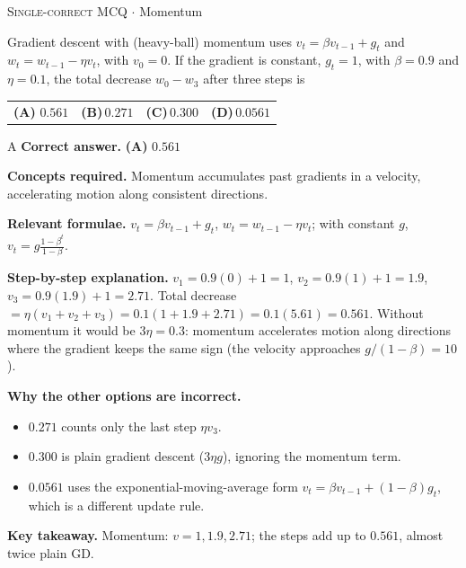\documentclass[11pt,a4paper]{article}
\newcommand{\optlabel}[1]{\textbf{(#1)}}
\newcommand{\correctlabel}[1]{\textcolor{okgreen}{\textbf{(#1)}\,\ding{51}}}
\newenvironment{qitem}[1]{\begin{list}{}{\setlength{\leftmargin}{3.3em}\setlength{\labelwidth}{3.1em}%
  \setlength{\labelsep}{0.2em}\setlength{\topsep}{3pt}\setlength{\parsep}{3pt}}\item[\textbf{Q.#1}\hfill]}{\end{list}}
\newcommand{\qsep}{\par\vspace{2pt}{\color{black!15}\hrule}\vspace{4pt}}
\newcommand{\qmeta}[2]{{\footnotesize\color{black!60}\textsc{#1} \;$\cdot$\; #2}\par}
\begin{document}
\begin{qitem}{14}
\qmeta{Single-correct MCQ}{Momentum}
Gradient descent with (heavy-ball) momentum uses $v_{t} = \beta v_{t-1} + g_t$ and $w_{t} = w_{t-1} - \eta v_t$,
with $v_0 = 0$. If the gradient is constant, $g_t = 1$, with $\beta = 0.9$ and $\eta = 0.1$, the total decrease
$w_0 - w_3$ after three steps is
\par\smallskip\noindent\begin{tabularx}{\linewidth}{@{}*{4}{L}@{}}
\correctlabel{A}\,$0.561$ & \optlabel{B}\,$0.271$ & \optlabel{C}\,$0.300$ & \optlabel{D}\,$0.0561$
\end{tabularx}
\end{qitem}
\begin{solbox}{A}
\textbf{\color{brand}Correct answer.} \textcolor{okgreen}{\textbf{(A)}} $0.561$

\textbf{\color{brand}Concepts required.} Momentum accumulates past gradients in a velocity, accelerating motion along consistent directions.

\textbf{\color{brand}Relevant formulae.} $v_t = \beta v_{t-1} + g_t$, $w_t = w_{t-1} - \eta v_t$; with constant $g$, $v_t = g\frac{1 - \beta^t}{1 - \beta}$.

\textbf{\color{brand}Step-by-step explanation.} $v_1 = 0.9(0) + 1 = 1$, $v_2 = 0.9(1) + 1 = 1.9$, $v_3 = 0.9(1.9) + 1 = 2.71$.
Total decrease $= \eta(v_1 + v_2 + v_3) = 0.1(1 + 1.9 + 2.71) = 0.1(5.61) = 0.561$.
Without momentum it would be $3\eta = 0.3$: momentum accelerates motion along directions where the gradient keeps the same
sign (the velocity approaches $g/(1-\beta) = 10$).

\textbf{\color{brand}Why the other options are incorrect.}
\begin{itemize}[leftmargin=2.4em, itemsep=1pt, topsep=2pt]
\item[\textbf{(B)}] $0.271$ counts only the last step $\eta v_3$.
\item[\textbf{(C)}] $0.300$ is plain gradient descent ($3\eta g$), ignoring the momentum term.
\item[\textbf{(D)}] $0.0561$ uses the exponential-moving-average form $v_t = \beta v_{t-1} + (1 - \beta)g_t$, which is a different update rule.
\end{itemize}
\textbf{\color{brand}Key takeaway.} Momentum: $v = 1, 1.9, 2.71$; the steps add up to $0.561$, almost twice plain GD.
\end{solbox}
\qsep
\end{document}
